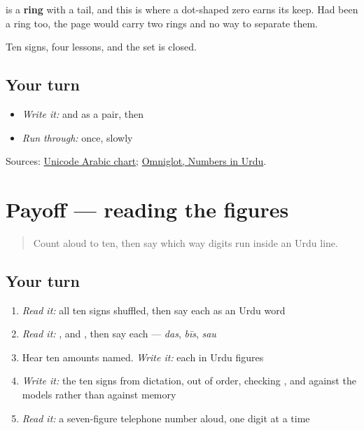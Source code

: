\textbf{} is a \textbf{ring} with a tail, and this is where a dot-shaped zero earns its keep. Had \textbf{} been a ring too, the page would carry two rings and no way to separate them.

Ten signs, four lessons, and the set is closed.

\subsection*{Your turn}
\begin{itemize}
\raggedright
  \item \emph{Write it:} \textbf{} and \textbf{} as a pair, then \textbf{}
  \item \emph{Run through:} \textbf{         } once, slowly
\end{itemize}

\begin{tcolorbox}[breakable,colback=teal!4,colframe=teal!35!black,title={Before you move on}]
Sources: \href{https://www.unicode.org/charts/PDF/U0600.pdf}{Unicode Arabic chart}; \href{https://www.omniglot.com/language/numbers/urdu.htm}{Omniglot, Numbers in Urdu}.
\end{tcolorbox}
\section[Practice]{Payoff — reading the figures}

\label{lesson:UR-C31-practice}



\begin{quote}
Count aloud to ten, then say which way digits run inside an Urdu line.
\end{quote}

\subsection*{Your turn}
\begin{enumerate}
\raggedright
  \item \emph{Read it:} all ten signs shuffled, then say each as an Urdu word
  \item \emph{Read it:} \textbf{}, \textbf{} and \textbf{}, then say each — \emph{das}, \emph{bīs}, \emph{sau}
  \item Hear ten amounts named. \emph{Write it:} each in Urdu figures
  \item \emph{Write it:} the ten signs from dictation, out of order, checking \textbf{}, \textbf{} and \textbf{} against the models rather than against memory
  \item \emph{Read it:} a seven-figure telephone number aloud, one digit at a time
\end{enumerate}

